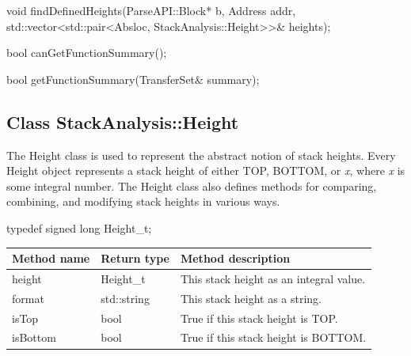 \begin{apient}
void findDefinedHeights(ParseAPI::Block* b,
                        Address addr,
                        std::vector<std::pair<Absloc, StackAnalysis::Height>>& heights);
\end{apient}


\begin{apient}
	bool canGetFunctionSummary();
\end{apient}

\begin{apient}
	bool getFunctionSummary(TransferSet& summary);
\end{apient}




\subsection{Class StackAnalysis::Height}

The Height class is used to represent the abstract notion of stack heights.  Every Height object represents a stack height of either TOP, BOTTOM, or \emph{x}, where \emph{x} is some integral number.  The Height class also defines methods for comparing, combining, and modifying stack heights in various ways.

\begin{apient}
typedef signed long Height_t;
\end{apient}

\begin{tabularx}{\textwidth}{llX}
	\toprule
	Method name & Return type & Method description \\
	\midrule
	height & Height\_t & This stack height as an integral value.\\
	format & std::string & This stack height as a string.\\
	isTop & bool & True if this stack height is TOP.\\
	isBottom & bool & True if this stack height is BOTTOM.\\
	\bottomrule
\end{tabularx}

